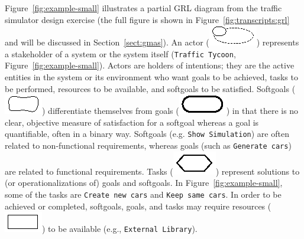 Figure~\ref{fig:example-small} illustrates a partial GRL diagram from the traffic simulator design exercise (the full figure is shown in Figure~\ref{fig:transcripts:grl} and will be discussed in Section~\ref{sect:gmas}). An actor (\includegraphics[scale=1]{img/actor}) represents a stakeholder of a system or the system itself (\texttt{Traffic Tycoon}, Figure~\ref{fig:example-small}). Actors are holders of intentions; they are the active entities in the system or its environment who want goals to be achieved, tasks to be performed, resources to be available, and softgoals to be satisfied. Softgoals (\includegraphics[scale=1]{img/softgoal}) differentiate themselves from goals (\includegraphics[scale=1]{img/goal}) in that there is no clear, objective measure of satisfaction for a softgoal whereas a goal is quantifiable, often in a binary way. Softgoals (e.g. \texttt{Show Simulation}) are often related to non-functional requirements, whereas goals (such as  \texttt{Generate cars}) are related to functional requirements. Tasks (\includegraphics[scale=1]{img/task}) represent solutions to (or operationalizations of) goals and softgoals. In Figure~\ref{fig:example-small}, some of the tasks are  \texttt{Create new cars} and \texttt{Keep same cars}. In order to be achieved or completed, softgoals, goals, and tasks may require resources (\includegraphics[scale=1]{img/resource}) to be available (e.g., \texttt{External Library}).

